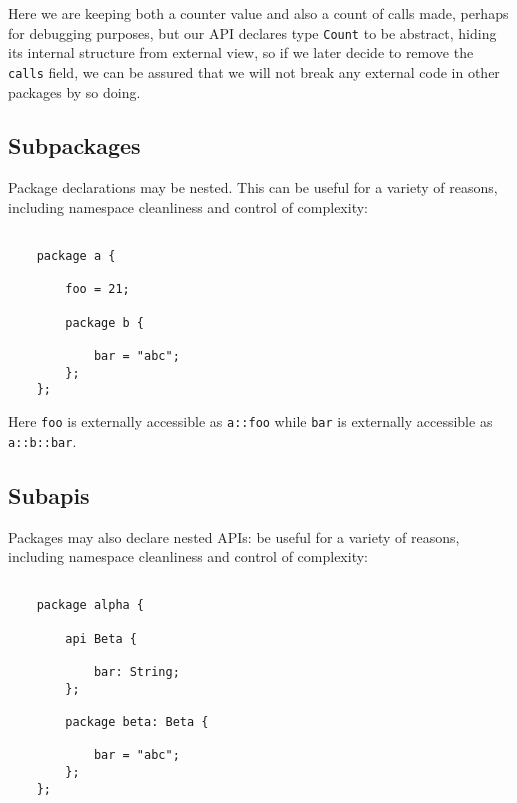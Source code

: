 Here we are keeping both a counter value and also a count 
of calls made, perhaps for debugging purposes, but our 
API declares type {\tt Count} to be abstract, hiding its 
internal structure from external view, so if we later decide 
to remove the {\tt calls} field, we can be assured that we 
will not break any external code in other packages by so 
doing.

\cutend*

\subsection{Subpackages}
\label{section:ref:subpackages}

Package declarations may be nested.  This can 
be useful for a variety of reasons, including 
namespace cleanliness and control of complexity:

\begin{verbatim}

    package a {

        foo = 21;

        package b {

            bar = "abc";
        };
    };

\end{verbatim}

Here {\tt foo} is externally accessible as {\tt a::foo} 
while {\tt bar} is externally accessible as  {\tt a::b::bar}.


\cutend*

\subsection{Subapis}
\label{section:ref:subapis}

Packages may also declare nested APIs: 
be useful for a variety of reasons, including 
namespace cleanliness and control of complexity:

\begin{verbatim}

    package alpha {

        api Beta {

            bar: String;
        };

        package beta: Beta {

            bar = "abc";
        };
    };

\end{verbatim}

